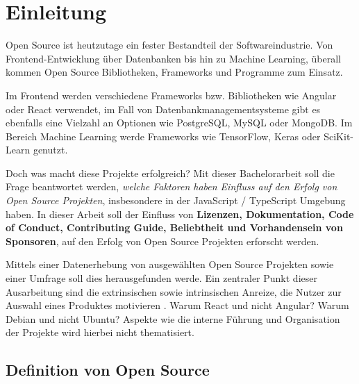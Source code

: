 \chapter{Einleitung}

Open Source ist heutzutage ein fester Bestandteil der Softwareindustrie.
Von Frontend-Entwicklung über Datenbanken bis hin zu Machine Learning, überall kommen Open Source
Bibliotheken, Frameworks und Programme zum Einsatz.

Im Frontend werden verschiedene Frameworks bzw. Bibliotheken wie Angular oder React verwendet,
im Fall von Datenbankmanagementsysteme gibt es ebenfalls eine Vielzahl an Optionen
wie PostgreSQL, MySQL oder MongoDB.
Im Bereich Machine Learning werde Frameworks wie TensorFlow, Keras oder SciKit-Learn genutzt.

Doch was macht diese Projekte erfolgreich?
Mit dieser Bachelorarbeit soll die Frage beantwortet werden, 
\textit{welche Faktoren haben Einfluss auf den Erfolg von Open Source Projekten}, insbesondere in 
der JavaScript / TypeScript Umgebung haben.
In dieser Arbeit soll der Einfluss von \textbf{Lizenzen, Dokumentation, Code of Conduct, Contributing
Guide, Beliebtheit und Vorhandensein von Sponsoren}, auf den Erfolg von Open Source Projekten 
erforscht werden. 


Mittels einer Datenerhebung von ausgewählten Open Source Projekten sowie einer
Umfrage soll dies herausgefunden werde.
Ein zentraler Punkt dieser Ausarbeitung sind die extrinsischen sowie intrinsischen Anreize, %
die Nutzer zur Auswahl eines Produktes motivieren \cite{midhaFactorsAffectingSuccess2012}. %
Warum React und nicht Angular? Warum Debian und nicht Ubuntu?
Aspekte wie die interne Führung und Organisation der Projekte wird hierbei nicht thematisiert.




\section{Definition von Open Source} \label{sec:definition_OpenSource}

